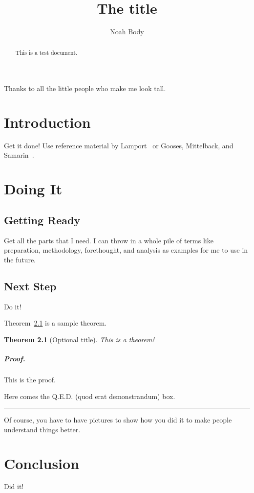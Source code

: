 \documentclass[12pt]{dalcsthesis}
\newtheorem{theorem}{Theorem}
\newenvironment{proof}{\paragraph{Proof.}}
{\nopagebreak\hfill\nopagebreak\rule{2mm}{2mm}\par\bigskip}
\begin{document}
\mcs  %
\title{The title}
\author{Noah Body}



\nolistoftables
\nolistoffigures

\frontmatter

\begin{abstract}
This is a test document.
\end{abstract}

\begin{acknowledgements}
Thanks to all the little people who make me look tall.
\end{acknowledgements}

\mainmatter

\chapter{Introduction}

Get it done!  Use reference material by Lamport~\cite{latex-by-lamport} or
Gooses, Mittelback, and Samarin~\cite{latex-companion}.

\chapter{Doing It}

\section{Getting Ready}

Get all the parts that I need.  I can throw in a whole pile of terms like
preparation,
methodology,
forethought,
and
analysis
as examples for me to use in the future.

\section{Next Step}

Do it!

Theorem~\ref{theorem-sample} is a sample theorem.

\begin{theorem}[Optional title] \label{theorem-sample}
    This is a theorem!
\end{theorem}

\begin{proof}
    This is the proof.

    Here comes the Q.E.D. (quod erat demonstrandum) box.
\end{proof}

Of course, you have to have pictures to show how you did it to make people
understand things better.

\chapter{Conclusion}

Did it!



\end{document}

